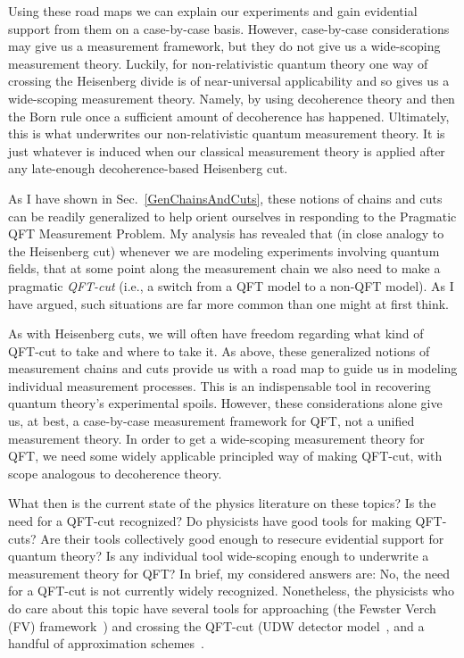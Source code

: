 \documentclass[prd,twocolumn,superscriptaddress,floatfix,amsmath,amssymb,amsfonts,nofootinbib]{revtex4-2}
\begin{document}
Using these road maps we can explain our experiments and gain evidential support from them on a case-by-case basis. However, case-by-case considerations may give us a measurement framework, but they do not give us a  wide-scoping measurement theory. Luckily, for non-relativistic quantum theory one way of crossing the Heisenberg divide is of near-universal applicability and so gives us a wide-scoping measurement theory. Namely, by using decoherence theory and then the Born rule once a sufficient amount of decoherence has happened. Ultimately, this is what underwrites our non-relativistic quantum measurement theory. It is just whatever is induced when our classical measurement theory is applied after any late-enough decoherence-based Heisenberg cut.

As I have shown in Sec.~\ref{GenChainsAndCuts}, these notions of chains and cuts can be readily generalized to help orient ourselves in responding to the Pragmatic QFT Measurement Problem. My analysis has revealed that (in close analogy to the Heisenberg cut) whenever we are modeling experiments involving quantum fields, that at some point along the  measurement chain we also need to make a pragmatic \textit{QFT-cut} (i.e., a switch from a QFT model to a non-QFT model). As I have argued, such situations are far more common than one might at first think.

As with Heisenberg cuts, we will often have freedom regarding what kind of QFT-cut to take and where to take it. As above, these generalized notions of measurement chains and cuts provide us with a road map to guide us in modeling individual measurement processes. This is an indispensable tool in recovering quantum theory's experimental spoils. However, these considerations alone give us, at best, a case-by-case measurement framework for QFT, not a unified measurement theory. In order to get a wide-scoping measurement theory for QFT, we need some widely applicable principled way of making QFT-cut, with scope analogous to decoherence theory.

What then is the current state of the physics literature on these topics? Is the need for a QFT-cut recognized? Do physicists have good tools for making QFT-cuts? Are their tools collectively good enough to resecure evidential support for quantum theory? Is any individual tool wide-scoping enough to underwrite a measurement theory for QFT? In brief, my considered answers are: No, the need for a QFT-cut is not currently widely recognized. Nonetheless, the physicists who do care about this topic have several tools for approaching (the Fewster Verch (FV) framework~\cite{fewster1,fewster2,fewster3,Ruep2021}) and crossing the QFT-cut (UDW detector model~\cite{Unruh1976,BLHu2007, Brown2013, Hotta2020, Zeromode,TaleOfTwo,Adam,Valentini1991, Reznik2003, Pozas-Kerstjens:2015,Menicucci, Terno2016, Cosmo, Henderson2018}, and a handful of approximation schemes~\cite{Rosaler,FlaminiaAchim}. 
\end{document}
